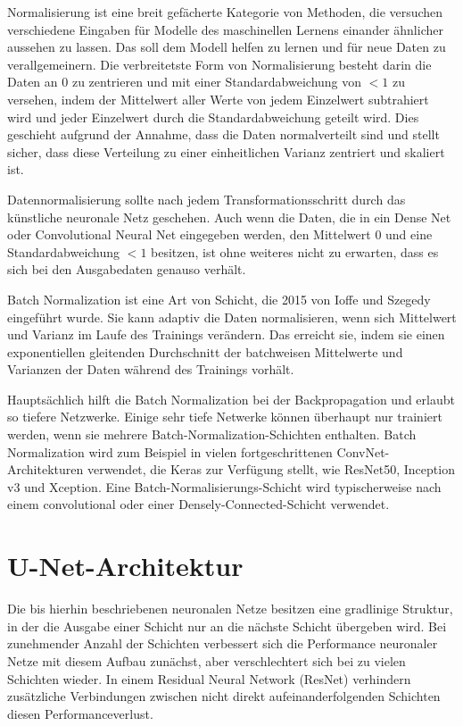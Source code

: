 Normalisierung ist eine breit gefächerte Kategorie von Methoden, die versuchen verschiedene Eingaben für Modelle des maschinellen Lernens einander ähnlicher aussehen zu lassen. Das soll dem Modell helfen zu lernen und für neue Daten zu verallgemeinern. Die verbreitetste Form von Normalisierung besteht darin die Daten an $0$ zu zentrieren und mit einer Standardabweichung von $<1$ zu versehen, indem der Mittelwert aller Werte von jedem Einzelwert subtrahiert wird und jeder Einzelwert durch die Standardabweichung geteilt wird. Dies geschieht aufgrund der Annahme, dass die Daten normalverteilt sind und stellt sicher, dass diese Verteilung zu einer einheitlichen Varianz zentriert und skaliert ist.

Datennormalisierung sollte nach jedem Transformationsschritt durch das künstliche neuronale Netz geschehen. Auch wenn die Daten, die in ein Dense Net oder Convolutional Neural Net eingegeben werden, den Mittelwert $0$ und eine Standardabweichung $< 1$ besitzen, ist ohne weiteres nicht zu erwarten, dass es sich bei den Ausgabedaten genauso verhält.

Batch Normalization ist eine Art von Schicht, die 2015 von Ioffe und Szegedy \cite{ioffe2015batchnorm} eingeführt wurde. Sie kann adaptiv die Daten normalisieren, wenn sich Mittelwert und Varianz im Laufe des Trainings verändern. Das erreicht sie, indem sie einen exponentiellen gleitenden Durchschnitt der batchweisen Mittelwerte und Varianzen der Daten während des Trainings vorhält.

Hauptsächlich hilft die Batch Normalization bei der Backpropagation und erlaubt so tiefere Netzwerke. Einige sehr tiefe Netwerke können überhaupt nur trainiert werden, wenn sie mehrere Batch-Normalization-Schichten enthalten. Batch Normalization wird zum Beispiel in vielen fortgeschrittenen ConvNet-Architekturen verwendet, die Keras zur Verfügung stellt, wie ResNet50, Inception v3 und Xception. Eine Batch-Normalisierungs-Schicht wird typischerweise nach einem convolutional oder einer Densely-Connected-Schicht verwendet.
\cite{chollet2021deep}

\section{U-Net-Architektur}
\label{sec:unet}
Die bis hierhin beschriebenen neuronalen Netze besitzen eine gradlinige Struktur, in der die Ausgabe einer Schicht nur an die nächste Schicht übergeben wird. Bei zunehmender Anzahl der Schichten verbessert sich die Performance neuronaler Netze mit diesem Aufbau zunächst, aber verschlechtert sich bei zu vielen Schichten wieder. In einem Residual Neural Network (ResNet) verhindern zusätzliche Verbindungen zwischen nicht direkt aufeinanderfolgenden Schichten diesen Performanceverlust.

